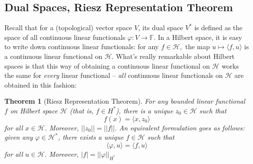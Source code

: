\documentclass{article}
\newtheorem{thm}{Theorem}[section]
\theoremstyle{definition}
\theoremstyle{remark}
\numberwithin{equation}{section}
\begin{document}
\subsection{Dual Spaces, Riesz Representation Theorem}
Recall that for a (topological) vector space $V$, its dual space $V^*$ is defined as the space of all continuous linear functionals $\varphi : V \rightarrow \mathbb{F}.$ In a Hilbert space, it is easy to write down continuous linear functionals: for any $f \in \mathcal{H},$ the map $u \mapsto \langle f, u \rangle $ is a continuous linear functional on $\mathcal{H}$. What's really remarkable about Hilbert spaces is that this way of obtaining a continuous linear functional on $\mathcal{H}$ works the same for \textit{every} linear functional -- \textit{all} continuous linear functionals on $\mathcal{H}$ are obtained in this fashion: 
\begin{thm}[Riesz Representation Theorem]
For any bounded linear functional $f$ on Hilbert space $\mathcal{H}$ (that is, $f \in H^*$), there is a unique $z_0 \in \mathcal{H}$ such that 
$$f(x) = \langle x, z_0 \rangle $$
for all $x \in \mathcal{H}$. Moreover, $||z_0|| = ||f||.$ An equivalent formulation goes as follows: given any $\varphi \in \mathcal{H}^*$, there exists a unique $f \in \mathcal{H}$ such that 
$$\langle \varphi, u \rangle = \langle f, u \rangle $$
for all $u \in \mathcal{H}.$ Moreover, $|f| = ||\varphi|| _{H^*}$
\end{thm}
\end{document}

